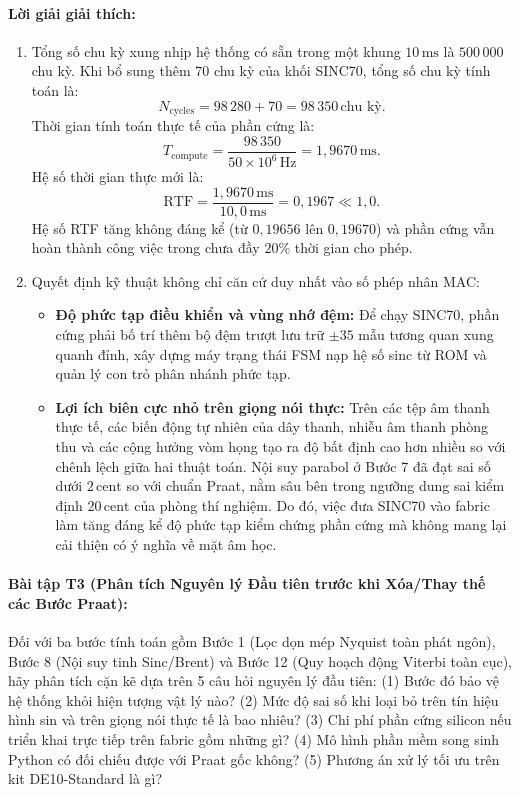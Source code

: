 \paragraph{Lời giải giải thích:}
\begin{enumerate}[label=\alph*)]
    \item Tổng số chu kỳ xung nhịp hệ thống có sẵn trong một khung $10\,\text{ms}$ là $500\,000$ chu kỳ.
    Khi bổ sung thêm $70$ chu kỳ của khối SINC70, tổng số chu kỳ tính toán là:
    \[
    N_{\mathrm{cycles}} = 98\,280 + 70 = 98\,350\,\text{chu kỳ}.
    \]
    Thời gian tính toán thực tế của phần cứng là:
    \[
    T_{\mathrm{compute}} = \frac{98\,350}{50 \times 10^6\,\text{Hz}} = 1{,}9670\,\text{ms}.
    \]
    Hệ số thời gian thực mới là:
    \[
    \text{RTF} = \frac{1{,}9670\,\text{ms}}{10{,}0\,\text{ms}} = 0{,}1967 \ll 1{,}0.
    \]
    Hệ số RTF tăng không đáng kể (từ $0{,}19656$ lên $0{,}19670$) và phần cứng vẫn hoàn thành công việc trong chưa đầy $20\%$ thời gian cho phép.
    \item Quyết định kỹ thuật không chỉ căn cứ duy nhất vào số phép nhân MAC:
    \begin{itemize}[leftmargin=1.2em]
        \item \textbf{Độ phức tạp điều khiển và vùng nhớ đệm:} Để chạy SINC70, phần cứng phải bố trí thêm bộ đệm trượt lưu trữ $\pm 35$ mẫu tương quan xung quanh đỉnh, xây dựng máy trạng thái FSM nạp hệ số sinc từ ROM và quản lý con trỏ phân nhánh phức tạp.
        \item \textbf{Lợi ích biên cực nhỏ trên giọng nói thực:} Trên các tệp âm thanh thực tế, các biến động tự nhiên của dây thanh, nhiễu âm thanh phòng thu và các cộng hưởng vòm họng tạo ra độ bất định cao hơn nhiều so với chênh lệch giữa hai thuật toán. Nội suy parabol ở Bước 7 đã đạt sai số dưới $2\,\text{cent}$ so với chuẩn Praat, nằm sâu bên trong ngưỡng dung sai kiểm định $20\,\text{cent}$ của phòng thí nghiệm. Do đó, việc đưa SINC70 vào fabric làm tăng đáng kể độ phức tạp kiểm chứng phần cứng mà không mang lại cải thiện có ý nghĩa về mặt âm học.
    \end{itemize}
\end{enumerate}

\paragraph{Bài tập T3 (Phân tích Nguyên lý Đầu tiên trước khi Xóa/Thay thế các Bước Praat):}
Đối với ba bước tính toán gồm Bước 1 (Lọc dọn mép Nyquist toàn phát ngôn), Bước 8 (Nội suy tinh Sinc/Brent) và Bước 12 (Quy hoạch động Viterbi toàn cục), hãy phân tích cặn kẽ dựa trên 5 câu hỏi nguyên lý đầu tiên: (1) Bước đó bảo vệ hệ thống khỏi hiện tượng vật lý nào? (2) Mức độ sai số khi loại bỏ trên tín hiệu hình sin và trên giọng nói thực tế là bao nhiêu? (3) Chi phí phần cứng silicon nếu triển khai trực tiếp trên fabric gồm những gì? (4) Mô hình phần mềm song sinh Python có đối chiếu được với Praat gốc không? (5) Phương án xử lý tối ưu trên kit DE10-Standard là gì?

